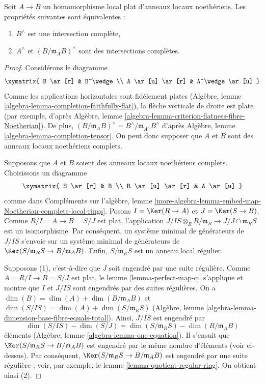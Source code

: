 \begin{proposition}
\label{proposition-avramov}
Soit $A \to B$ un homomorphisme local plat d'anneaux locaux noethériens.
Les propriétés suivantes sont équivalentes :
\begin{enumerate}
\item $B^\wedge$ est une intersection complète,
\item $A^\wedge$ et $(B/\mathfrak m_A B)^\wedge$ sont des intersections complètes.
\end{enumerate}
\end{proposition}

\begin{proof}
Considérons le diagramme
$$
\xymatrix{
B \ar[r] & B^\wedge \\
A \ar[u] \ar[r] & A^\wedge \ar[u]
}
$$
Comme les applications horizontales sont fidèlement plates
(Algèbre, lemme \ref{algebra-lemma-completion-faithfully-flat}),
la flèche verticale de droite est plate
(par exemple, d'après Algèbre, lemme
\ref{algebra-lemma-criterion-flatness-fibre-Noetherian}).
De plus,
$(B/\mathfrak m_A B)^\wedge = B^\wedge/\mathfrak m_{A^\wedge} B^\wedge$
d'après Algèbre, lemme \ref{algebra-lemma-completion-tensor}.
On peut donc supposer que $A$ et $B$ sont des anneaux locaux noethériens
complets.

\medskip\noindent
Supposons que $A$ et $B$ soient des anneaux locaux noethériens complets.
Choisissons un diagramme
$$
\xymatrix{
S \ar[r] & B \\
R \ar[u] \ar[r] & A \ar[u]
}
$$
comme dans Compléments sur l'algèbre, lemme
\ref{more-algebra-lemma-embed-map-Noetherian-complete-local-rings}.
Posons $I = \Ker(R \to A)$ et $J = \Ker(S \to B)$.
Comme $R/I = A \to B = S/J$ est plat, l'application
$J/IS \otimes_R R/\mathfrak m_R \to J/J \cap \mathfrak m_R S$
est un isomorphisme. Par conséquent, un système minimal de générateurs
de $J/IS$ s'envoie sur un système minimal de générateurs de
$\Ker(S/\mathfrak m_R S \to B/\mathfrak m_A B)$.
Enfin, $S/\mathfrak m_R S$ est un anneau local régulier.

\medskip\noindent
Supposons (1), c'est-à-dire que $J$ soit engendré par une suite régulière.
Comme $A = R/I \to B = S/J$ est plat, le
lemme \ref{lemma-perfect-map-ci} s'applique et montre
que $I$ et $J/IS$ sont engendrés par des suites régulières.
On a $\dim(B) = \dim(A) + \dim(B/\mathfrak m_A B)$ et
$\dim(S/IS) = \dim(A) + \dim(S/\mathfrak m_R S)$
(Algèbre, lemme \ref{algebra-lemma-dimension-base-fibre-equals-total}).
Ainsi, $J/IS$ est engendré par
$$
\dim(S/IS) - \dim(S/J) = \dim(S/\mathfrak m_R S) - \dim(B/\mathfrak m_A B)
$$
éléments (Algèbre, lemme \ref{algebra-lemma-one-equation}).
Il s'ensuit que $\Ker(S/\mathfrak m_R S \to B/\mathfrak m_A B)$
est engendré par le même nombre d'éléments (voir ci-dessus).
Par conséquent, $\Ker(S/\mathfrak m_R S \to B/\mathfrak m_A B)$
est engendré par une suite régulière ; voir, par exemple, le
lemme \ref{lemma-quotient-regular-ring}.
On obtient ainsi (2).


\end{proof}
